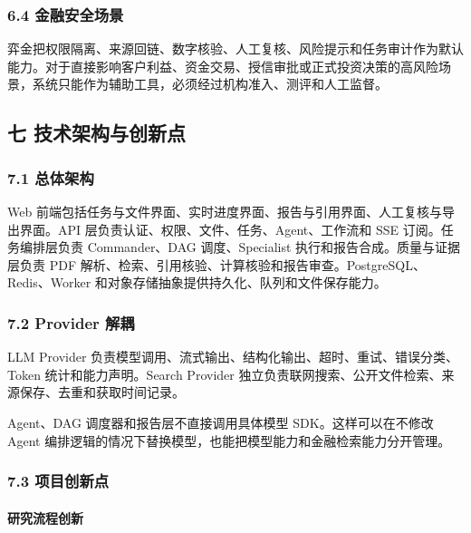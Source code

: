 \documentclass[a4paper,12pt,fontset=none]{ctexart}
\begin{document}
\subsubsection{6.4
金融安全场景}\label{ux91d1ux878dux5b89ux5168ux573aux666f}

弈金把权限隔离、来源回链、数字核验、人工复核、风险提示和任务审计作为默认能力。对于直接影响客户利益、资金交易、授信审批或正式投资决策的高风险场景，系统只能作为辅助工具，必须经过机构准入、测评和人工监督。

\subsection{七
技术架构与创新点}\label{ux4e03-ux6280ux672fux67b6ux6784ux4e0eux521bux65b0ux70b9}

\subsubsection{7.1 总体架构}\label{ux603bux4f53ux67b6ux6784}

Web
前端包括任务与文件界面、实时进度界面、报告与引用界面、人工复核与导出界面。API
层负责认证、权限、文件、任务、Agent、工作流和 SSE 订阅。任务编排层负责
Commander、DAG 调度、Specialist 执行和报告合成。质量与证据层负责 PDF
解析、检索、引用核验、计算核验和报告审查。PostgreSQL、Redis、Worker
和对象存储抽象提供持久化、队列和文件保存能力。

\subsubsection{7.2 Provider 解耦}\label{provider-ux89e3ux8026}

LLM Provider
负责模型调用、流式输出、结构化输出、超时、重试、错误分类、Token
统计和能力声明。Search Provider
独立负责联网搜索、公开文件检索、来源保存、去重和获取时间记录。

Agent、DAG 调度器和报告层不直接调用具体模型 SDK。这样可以在不修改 Agent
编排逻辑的情况下替换模型，也能把模型能力和金融检索能力分开管理。

\subsubsection{7.3 项目创新点}\label{ux9879ux76eeux521bux65b0ux70b9}

\paragraph{研究流程创新}\label{ux7814ux7a76ux6d41ux7a0bux521bux65b0}
\end{document}
